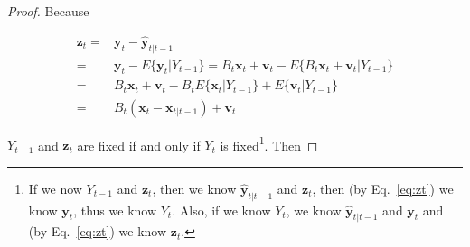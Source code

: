\documentclass[12pt]{article}
\begin{document}
\begin{proof}
    Because

    \begin{align}
        \mathbf{z}_t=&\mathbf{y}_t-\hat{\mathbf{y}}_{t|t-1}\label{eq:zt}\\
                    =&\mathbf{y}_t-E\{\mathbf{y}_t|Y_{t-1}\}=B_t\mathbf{x}_t+\mathbf{v}_t-E\{B_t\mathbf{x}_t+\mathbf{v}_t|Y_{t-1}\}\nonumber\\
                    =&B_t\mathbf{x}_t+\mathbf{v}_t-B_tE\{\mathbf{x}_t|Y_{t-1}\}+E\{\mathbf{v}_t|Y_{t-1}\}\nonumber\\
                    =&B_t(\mathbf{x}_t-\mathbf{x}_{t|t-1})+\mathbf{v}_t\label{eq:zt2}
    \end{align}

    \noindent $Y_{t-1}$ and $\mathbf{z}_t$ are fixed if and only if $Y_t$ is
    fixed\footnote{If we now $Y_{t-1}$ and $\mathbf{z}_t$, then we know
    $\hat{\mathbf{y}}_{t|t-1}$ and $\mathbf{z}_t$, then (by Eq.~\ref{eq:zt}) we
    know $\mathbf{y}_t$, thus we know $Y_t$. Also, if we know $Y_t$, we know
    $\hat{\mathbf{y}}_{t|t-1}$ and $\mathbf{y}_t$ and (by Eq.~\ref{eq:zt}) we
    know $\mathbf{z}_t$.}. Then


\end{proof}
\end{document}
